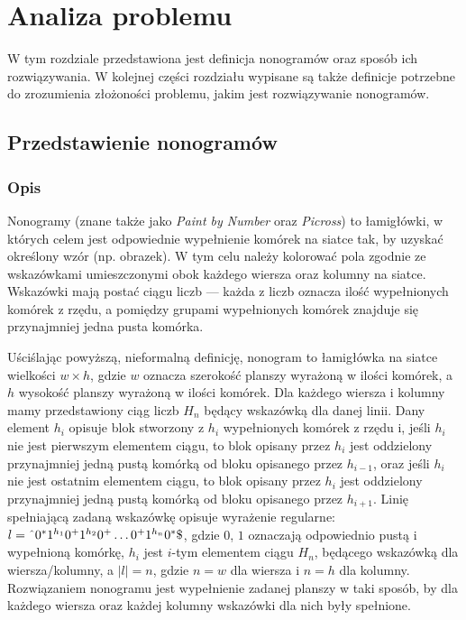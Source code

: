 \chapter{Analiza problemu}
\thispagestyle{chapterBeginStyle}
\label{rozdzial1}

    W tym rozdziale przedstawiona jest definicja nonogramów oraz sposób ich rozwiązywania.
W kolejnej części rozdziału wypisane są także definicje potrzebne do zrozumienia złożoności problemu,
jakim jest rozwiązywanie nonogramów.



\section{Przedstawienie nonogramów}


\subsection{Opis}
    Nonogramy (znane także jako \textit{Paint by Number} oraz \textit{Picross}) to łamigłówki, w których
celem jest odpowiednie wypełnienie komórek na siatce tak, by uzyskać określony wzór (np. obrazek).
W tym celu należy kolorować pola zgodnie ze wskazówkami umieszczonymi obok każdego wiersza oraz kolumny
na siatce. Wskazówki mają postać ciągu liczb — każda z liczb oznacza ilość wypełnionych komórek z rzędu,
a pomiędzy grupami wypełnionych komórek znajduje się przynajmniej jedna pusta komórka.

    Uściślając powyższą, nieformalną definicję, nonogram to łamigłówka na siatce wielkości $w \times h$,
gdzie $w$ oznacza szerokość planszy wyrażoną w ilości komórek, a $h$ wysokość planszy wyrażoną w
ilości komórek. Dla każdego wiersza i kolumny mamy przedstawiony ciąg liczb $H_n$ będący wskazówką
dla danej linii. Dany element $h_i$ opisuje blok stworzony z $h_i$ wypełnionych komórek z rzędu i, jeśli
$h_i$ nie jest pierwszym elementem ciągu, to blok opisany przez $h_i$ jest oddzielony 
przynajmniej jedną pustą komórką od bloku opisanego przez $h_{i-1}$, 
oraz jeśli $h_i$ nie jest ostatnim elementem ciągu, to blok opisany przez $h_i$ jest oddzielony
przynajmniej jedną pustą komórką od bloku opisanego przez $h_{i+1}$. Linię spełniającą zadaną wskazówkę
opisuje wyrażenie regularne: $l=\text{\^{}}0^*1^{h_1}0^+1^{h_2}0^+\ldots0^+1^{h_n}0^*\text{\$}$, gdzie 
$0$, $1$ oznaczają odpowiednio pustą i wypełnioną komórkę, $h_i$ jest $i$-tym elementem ciągu $H_n$,
będącego wskazówką dla wiersza/kolumny, a $|l| = n$, gdzie $n = w$ dla wiersza i $n = h$ dla kolumny. 
Rozwiązaniem nonogramu jest wypełnienie zadanej planszy w taki sposób, 
by dla każdego wiersza oraz każdej kolumny wskazówki dla nich były spełnione.

